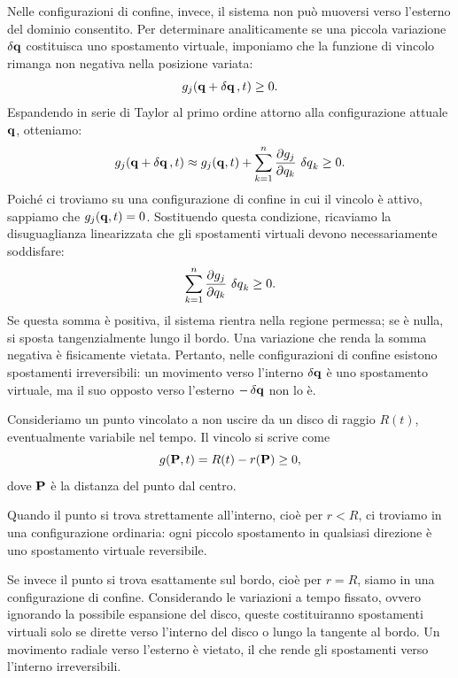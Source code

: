 Nelle configurazioni di confine, invece, il sistema non può muoversi verso l'esterno del dominio consentito. Per determinare analiticamente se una piccola variazione $\var{\vb{q}}$ costituisca uno spostamento virtuale, imponiamo che la funzione di vincolo rimanga non negativa nella posizione variata: 
\begin{equation*}
    g_j(\vb{q} + \var{\vb{q}}, t) \geq 0.
\end{equation*}
Espandendo in serie di Taylor al primo ordine attorno alla configurazione attuale $\vb{q}$, otteniamo:
\begin{equation*}
    g_j(\vb{q} + \var{\vb{q}}, t) \approx g_j(\vb{q}, t) + \sum_{k=1}^n \pdv{g_j}{q_k}\,\var{q}_k \geq 0.
\end{equation*}
Poiché ci troviamo su una configurazione di confine in cui il vincolo è attivo, sappiamo che $g_j(\vb{q}, t) = 0$. Sostituendo questa condizione, ricaviamo la disuguaglianza linearizzata che gli spostamenti virtuali devono necessariamente soddisfare:
\begin{equation*}
    \sum_{k=1}^n \pdv{g_j}{q_k}\,\var{q}_k \geq 0.
\end{equation*}
Se questa somma è positiva, il sistema rientra nella regione permessa; se è nulla, si sposta tangenzialmente lungo il bordo. Una variazione che renda la somma negativa è fisicamente vietata. Pertanto, nelle configurazioni di confine esistono spostamenti irreversibili: un movimento verso l'interno $\var{\vb{q}}$ è uno spostamento virtuale, ma il suo opposto verso l'esterno $-\var{\vb{q}}$ non lo è.

\begin{example}
Consideriamo un punto vincolato a non uscire da un disco di raggio $R(t)$, eventualmente variabile nel tempo. Il vincolo si scrive come 
\begin{equation*}
    g(\vb{P}, t) = R(t) - r(\vb{P}) \geq 0,
\end{equation*}
dove $\vb{P}$ è la distanza del punto dal centro.

Quando il punto si trova strettamente all'interno, cioè per $r < R$, ci troviamo in una configurazione ordinaria: ogni piccolo spostamento in qualsiasi direzione è uno spostamento virtuale reversibile.

Se invece il punto si trova esattamente sul bordo, cioè per $r = R$, siamo in una configurazione di confine. Considerando le variazioni a tempo fissato, ovvero ignorando la possibile espansione del disco, queste costituiranno spostamenti virtuali solo se dirette verso l'interno del disco o lungo la tangente al bordo. Un movimento radiale verso l'esterno è vietato, il che rende gli spostamenti verso l'interno irreversibili.
\end{example}

